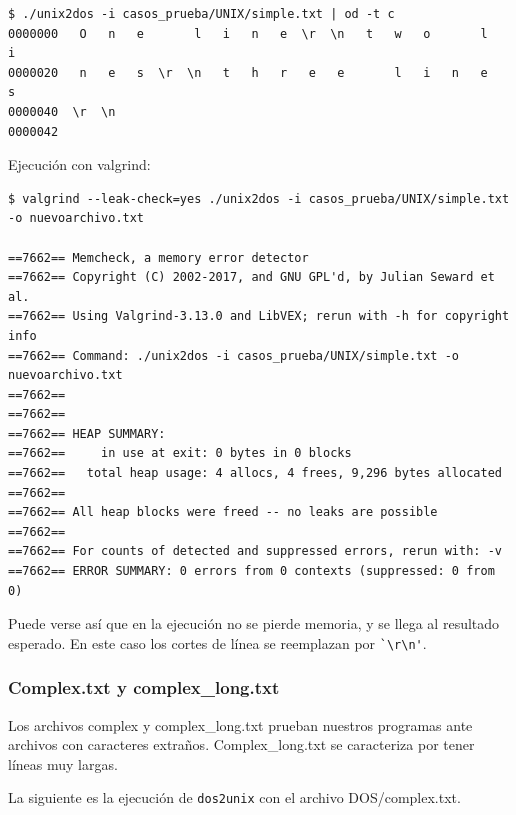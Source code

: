 \documentclass[a4paper,10pt, spanish]{article}
\begin{document}
\begin{lstlisting}
$ ./unix2dos -i casos_prueba/UNIX/simple.txt | od -t c
0000000   O   n   e       l   i   n   e  \r  \n   t   w   o       l   i
0000020   n   e   s  \r  \n   t   h   r   e   e       l   i   n   e   s
0000040  \r  \n
0000042
\end{lstlisting}
Ejecución con valgrind:
\begin{lstlisting}
$ valgrind --leak-check=yes ./unix2dos -i casos_prueba/UNIX/simple.txt -o nuevoarchivo.txt

==7662== Memcheck, a memory error detector
==7662== Copyright (C) 2002-2017, and GNU GPL'd, by Julian Seward et al.
==7662== Using Valgrind-3.13.0 and LibVEX; rerun with -h for copyright info
==7662== Command: ./unix2dos -i casos_prueba/UNIX/simple.txt -o nuevoarchivo.txt
==7662== 
==7662== 
==7662== HEAP SUMMARY:
==7662==     in use at exit: 0 bytes in 0 blocks
==7662==   total heap usage: 4 allocs, 4 frees, 9,296 bytes allocated
==7662== 
==7662== All heap blocks were freed -- no leaks are possible
==7662== 
==7662== For counts of detected and suppressed errors, rerun with: -v
==7662== ERROR SUMMARY: 0 errors from 0 contexts (suppressed: 0 from 0)
\end{lstlisting}

Puede verse así que en la ejecución no se pierde memoria, y se llega al resultado esperado.
En este caso los cortes de línea se reemplazan por \lstinline{`\r\n'}.

\subsubsection{Complex.txt y complex\_long.txt}

Los archivos complex y complex\_long.txt prueban nuestros programas ante archivos con caracteres
extraños. Complex\_long.txt se caracteriza por tener líneas muy largas.

La siguiente es la ejecución de \lstinline{dos2unix} con el archivo DOS/complex.txt. 
\end{document}

